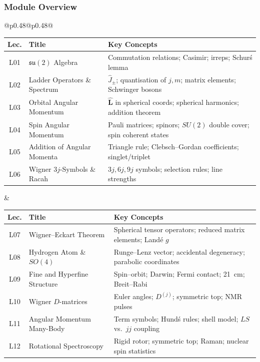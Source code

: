 \documentclass[11pt,a4paper]{article}
\begin{document}
\subsubsection*{Module Overview}

\begin{center}
\begin{tabular}{@{}p{}@{\textwidth}p{}@{}}
\begin{tabular}[t]{@{}clp{4.5cm}@{}}
\toprule
\textbf{Lec.} & \textbf{Title} & \textbf{Key Concepts}\\
\midrule
L01 & $\mathfrak{su}(2)$ Algebra & Commutation relations; Casimir; irreps; Schur\'s lemma\\
L02 & Ladder Operators \& Spectrum & $\hat{J}_\pm$; quantisation of $j,m$; matrix elements; Schwinger bosons\\
L03 & Orbital Angular Momentum & $\hat{\mathbf{L}}$ in spherical coords; spherical harmonics; addition theorem\\
L04 & Spin Angular Momentum & Pauli matrices; spinors; $SU(2)$ double cover; spin coherent states\\
L05 & Addition of Angular Momenta & Triangle rule; Clebsch--Gordan coefficients; singlet/triplet\\
L06 & Wigner $3j$-Symbols \& Racah & $3j,6j,9j$ symbols; selection rules; line strengths\\
\bottomrule
\end{tabular}
&
\begin{tabular}[t]{@{}clp{4.5cm}@{}}
\toprule
\textbf{Lec.} & \textbf{Title} & \textbf{Key Concepts}\\
\midrule
L07 & Wigner--Eckart Theorem & Spherical tensor operators; reduced matrix elements; Land\'e $g$\\
L08 & Hydrogen Atom \& $SO(4)$ & Runge--Lenz vector; accidental degeneracy; parabolic coordinates\\
L09 & Fine and Hyperfine Structure & Spin--orbit; Darwin; Fermi contact; 21~cm; Breit--Rabi\\
L10 & Wigner $D$-matrices & Euler angles; $D^{(j)}$; symmetric top; NMR pulses\\
L11 & Angular Momentum Many-Body & Term symbols; Hund\'s rules; shell model; $LS$ vs.\ $jj$ coupling\\
L12 & Rotational Spectroscopy & Rigid rotor; symmetric top; Raman; nuclear spin statistics\\
\bottomrule
\end{tabular}
\\
\end{tabular}
\end{center}
\end{document}
